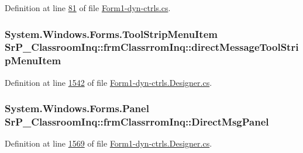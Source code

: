 \-Definition at line \hyperlink{_form1-dyn-ctrls_8cs_source_l00081}{81} of file \hyperlink{_form1-dyn-ctrls_8cs_source}{\-Form1-\/dyn-\/ctrls.\-cs}.

\hypertarget{class_sr_p___classroom_inq_1_1frm_classrrom_inq_a8df7e0c2f5ac4cb1494004d85940a786}{
\subsubsection[{direct\-Message\-Tool\-Strip\-Menu\-Item}]{\setlength{\rightskip}{0pt plus 5cm}\-System.\-Windows.\-Forms.\-Tool\-Strip\-Menu\-Item {\bf \-Sr\-P\-\_\-\-Classroom\-Inq\-::frm\-Classrrom\-Inq\-::direct\-Message\-Tool\-Strip\-Menu\-Item}}}
\label{class_sr_p___classroom_inq_1_1frm_classrrom_inq_a8df7e0c2f5ac4cb1494004d85940a786}


\-Definition at line \hyperlink{_form1-dyn-ctrls_8_designer_8cs_source_l01542}{1542} of file \hyperlink{_form1-dyn-ctrls_8_designer_8cs_source}{\-Form1-\/dyn-\/ctrls.\-Designer.\-cs}.

\hypertarget{class_sr_p___classroom_inq_1_1frm_classrrom_inq_a3241f0f690675052aff4224bc4fabc3d}{
\subsubsection[{\-Direct\-Msg\-Panel}]{\setlength{\rightskip}{0pt plus 5cm}\-System.\-Windows.\-Forms.\-Panel {\bf \-Sr\-P\-\_\-\-Classroom\-Inq\-::frm\-Classrrom\-Inq\-::\-Direct\-Msg\-Panel}}}
\label{class_sr_p___classroom_inq_1_1frm_classrrom_inq_a3241f0f690675052aff4224bc4fabc3d}


\-Definition at line \hyperlink{_form1-dyn-ctrls_8_designer_8cs_source_l01569}{1569} of file \hyperlink{_form1-dyn-ctrls_8_designer_8cs_source}{\-Form1-\/dyn-\/ctrls.\-Designer.\-cs}.

